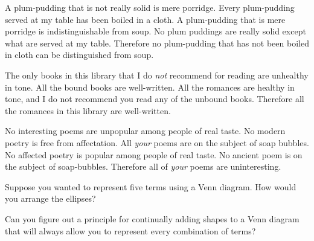 {\begin{exercises}
\item \label{itm:plum-pudding} A plum-pudding that is not really solid is mere porridge. Every plum-pudding served at my table has been boiled in a cloth. A plum-pudding that is mere porridge is indistinguishable from soup. No plum puddings are really solid except what are served at my table. Therefore no plum-pudding that has not been boiled in cloth can be distinguished from soup. %

\item \label{itm:books} The only books in this library that I do \textit{not} recommend for reading are unhealthy in tone. All the bound books are well-written. All the romances are healthy in tone, and I do not recommend you read any of the unbound books. Therefore all the romances in this library are well-written. 

\item \label{itm: poems} No interesting poems are unpopular among people of real taste. No modern poetry is free from affectation. All \textit{your} poems are on the subject of soap bubbles. No affected poetry is popular among people of real taste. No ancient poem is on the subject of soap-bubbles. Therefore all of \textit{your} poems are uninteresting. %

\end{exercises}
                                    
\noindent\problempart
\begin{exercises}
\item Suppose you wanted to represent five terms using a Venn diagram. How would you arrange the ellipses? 
\item Can you figure out a principle for continually adding shapes to a Venn diagram that will always allow you to represent every combination of terms?
\end{exercises}

%

}{}


